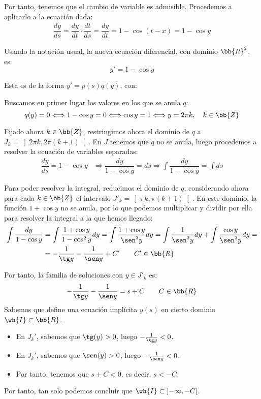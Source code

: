 \begin{ejercicio}
    Por tanto, tenemos que el cambio de variable es admisible. Procedemos a aplicarlo a la ecuación dada:
    \begin{align*}
        \dfrac{dy}{ds} = \dfrac{dy}{dt}\cdot \dfrac{dt}{ds} = \dfrac{dy}{dt} = 1-\cos(t-x) = 1-\cos y
    \end{align*}

    Usando la notación usual, la nueva ecuación diferencial, con dominio $\bb{R}^2$, es:
    \begin{equation*}
        y' = 1-\cos y
    \end{equation*}

    Esta es de la forma $y' = p(s)q(y)$, con:

    Buscamos en primer lugar los valores en los que se anula $q$:
    \begin{equation*}
        q(y) = 0 \Longleftrightarrow 1-\cos y = 0 \Longleftrightarrow \cos y = 1 \Longleftrightarrow y = 2\pi k, \quad k\in \bb{Z}
    \end{equation*}

    Fijado ahora $k\in \bb{Z}$, restringimos ahora el dominio de $q$ a $J_k=\left]2\pi k, 2\pi(k+1)\right[$. En $J$ tenemos que $q$ no se anula, luego procedemos a resolver la ecuación de variables separadas:
    \begin{align*}
        \dfrac{dy}{ds} = 1-\cos y &\Longrightarrow \dfrac{dy}{1-\cos y} = ds \Longrightarrow \int \dfrac{dy}{1-\cos y} = \int ds
    \end{align*}

    Para poder resolver la integral, reducimos el dominio de $q$, considerando ahora para cada $k\in \bb{Z}$ el intervalo $J'_k=\left]\pi k, \pi(k+1)\right[$. En este dominio, la función $1+\cos y$ no se anula, por lo que podemos multiplicar y dividir por ella para resolver la integral a la que hemos llegado:
    \begin{align*}
        \int \dfrac{dy}{1-\cos y} &= \int \dfrac{1+\cos y}{1-\cos^2 y}dy = \int \dfrac{1+\cos y}{\sen^2 y}dy = \int \dfrac{1}{\sen^2 y}dy + \int \dfrac{\cos y}{\sen^2 y}dy =\\
        &= -\dfrac{1}{\tg y} -\dfrac{1}{\sen y} + C' \qquad C'\in \bb{R}
    \end{align*}

    Por tanto, la familia de soluciones con $y\in J'_k$ es:
    \begin{equation*}
        -\dfrac{1}{\tg y} -\dfrac{1}{\sen y} = s + C \qquad C\in \bb{R}
    \end{equation*}
    Sabemos que define una ecuación implícita $y(s)$ en cierto dominio $\wh{I}\subset \bb{R}$.
    \begin{itemize}
        \item En $J_k'$, sabemos que $\tg(y)>0$, luego $-\frac{1}{\tg y}<0$.
        \item En $J_k'$, sabemos que $\sen(y)>0$, luego $-\frac{1}{\sen y}<0$.
        \item Por tanto, tenemos que $s+C<0$, es decir, $s<-C$.
    \end{itemize}
    Por tanto, tan solo podemos concluir que $\wh{I}\subset \left]-\infty, -C\right[$.


\end{ejercicio}
